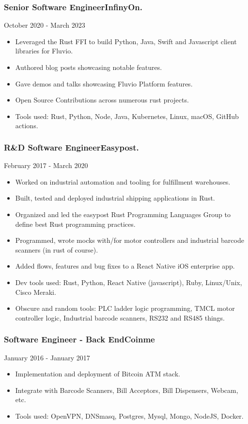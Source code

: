 \documentclass[9pt]{article}
\newenvironment{changemargin}[2]{%
  \begin{list}{}{%
    \setlength{\topsep}{0pt}%
    \setlength{\leftmargin}{#1}%
    \setlength{\rightmargin}{#2}%
    \setlength{\listparindent}{\parindent}%
    \setlength{\itemindent}{\parindent}%
    \setlength{\parsep}{\parskip}%
  }%
  \item[]}{\end{list}
}
\newenvironment{body} {
    \vspace*{-16pt}
    \begin{changemargin}{-0.20in}{-0.5in}
  }
    {\end{changemargin}
}
\newenvironment{jobdescriptionlist}[3]{
  \subsubsection*{#1\hfill\small#2}
  \small
  \vspace*{-5pt}
  {\hfill #3}
  \vspace*{-10pt}
  \begin{itemize}
   \setlength{\topsep}{0pt}
   \setlength{\itemsep}{1pt}
   \setlength{\parskip}{0pt}
   \setlength{\parsep}{0pt}
}{\end{itemize}\vspace*{-3pt}\normalsize}
\begin{document}
\begin{body}
    \vspace{18pt}
    \begin{jobdescriptionlist}{Senior Software Engineer}{InfinyOn.}{October 2020 - March 2023}
        \item Leveraged the Rust FFI to build Python, Java, Swift and Javascript client libraries for Fluvio.
        \item Authored blog posts showcasing notable features.
        \item Gave demos and talks showcasing Fluvio Platform features.
        \item Open Source Contributions across numerous rust projects.
        \item Tools used: Rust, Python, Node, Java, Kubernetes, Linux, macOS, GitHub actions.
    \end{jobdescriptionlist}

    \begin{jobdescriptionlist}{R\&D Software Engineer}{Easypost.}{February 2017 - March 2020}
        \item Worked on industrial automation and tooling for fulfillment warehouses.
        \item Built, tested and deployed industrial shipping applications in Rust.
        \item Organized and led the easypost Rust Programming Languages Group to define best Rust programming practices.
        \item Programmed, wrote mocks with/for motor controllers and industrial barcode scanners (in rust of course).
        \item Added flows, features and bug fixes to a React Native iOS enterprise app.
        \item Dev tools used: Rust, Python, React Native (javascript), Ruby, Linux/Unix, Cisco Meraki.
        \item Obscure and random tools: PLC ladder logic programming, TMCL motor controller logic, Industrial barcode scanners, RS232 and RS485 things.
    \end{jobdescriptionlist}

    \begin{jobdescriptionlist}{Software Engineer - Back End}{Coinme}{January 2016 - January 2017}
        \item Implementation and deployment of Bitcoin ATM stack.
        \item Integrate with Barcode Scanners, Bill Acceptors, Bill Dispensers, Webcam, etc.
        \item Tools used: OpenVPN, DNSmasq, Postgres, Mysql, Mongo, NodeJS, Docker.
    \end{jobdescriptionlist}


\end{body}
\end{document}
